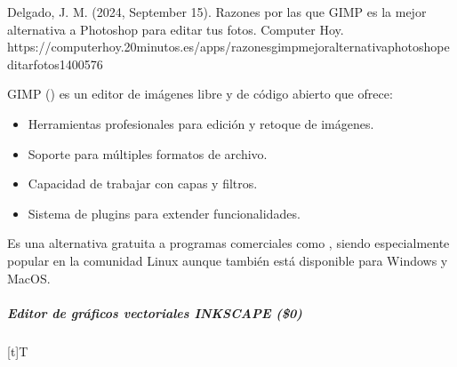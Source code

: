 \documentclass[letterpaper,10pt,spanish]{sphinxmanual}
\let\sphinxpxdimen\pdfpxdimen\else\newdimen\sphinxpxdimen
\begin{document}
\sphinxAtStartPar
%
\begin{footnote}[5]\sphinxAtStartFootnote
Delgado, J. M. (2024, September 15). Razones por las que GIMP es la mejor alternativa a Photoshop para editar tus fotos. Computer Hoy. https://computerhoy.20minutos.es/apps/razones\sphinxhyphen{}gimp\sphinxhyphen{}mejor\sphinxhyphen{}alternativa\sphinxhyphen{}photoshop\sphinxhyphen{}editar\sphinxhyphen{}fotos\sphinxhyphen{}1400576
%
\end{footnote} GIMP () es un editor de imágenes libre y de código abierto que ofrece:
\begin{itemize}
\item {} 
\sphinxAtStartPar
Herramientas profesionales para edición y retoque de imágenes.

\item {} 
\sphinxAtStartPar
Soporte para múltiples formatos de archivo.

\item {} 
\sphinxAtStartPar
Capacidad de trabajar con capas y filtros.

\item {} 
\sphinxAtStartPar
Sistema de plugins para extender funcionalidades.

\end{itemize}

\sphinxAtStartPar
Es una alternativa gratuita a programas comerciales como , siendo especialmente popular en la comunidad Linux aunque también está disponible para Windows y MacOS.


\subparagraph{Editor de gráficos vectoriales INKSCAPE (\$0)}
\label{\detokenize{cursos/ofimatica10/recursos/T02:editor-de-graficos-vectoriales-inkscape-0}}

\begin{savenotes}\sphinxattablestart
\sphinxthistablewithglobalstyle
\centering
\begin{tabulary}{\linewidth}[t]{T}
\sphinxtoprule
\sphinxtableatstartofbodyhook

\begin{sphinxfigure-in-table}
\centering
\capstart
\noindent\sphinxincludegraphics[width=360\sphinxpxdimen]{{image061}.png}
\label{\detokenize{cursos/ofimatica10/recursos/T02:id38}}\end{sphinxfigure-in-table}\relax
\\
\sphinxbottomrule
\end{tabulary}
\sphinxtableafterendhook\par
\sphinxattableend\end{savenotes}
\end{document}
